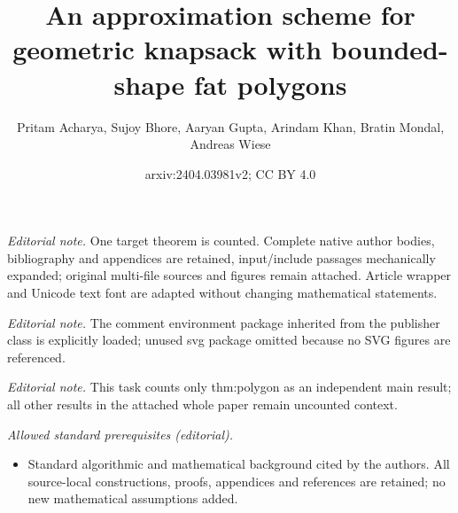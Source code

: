 \documentclass[10pt,a4paper]{article}
\title{An approximation scheme for geometric knapsack with bounded-shape fat polygons}
\author{Pritam Acharya, Sujoy Bhore, Aaryan Gupta, Arindam Khan, Bratin Mondal, Andreas Wiese}
\date{arxiv:2404.03981v2; CC BY 4.0}
\theoremstyle{plain}
\theoremstyle{plain}
\theoremstyle{plain}
\theoremstyle{definition}
\begin{document}
\maketitle
\noindent\textit{Editorial note.} One target theorem is counted. Complete native author bodies, bibliography and appendices are retained, input/include passages mechanically expanded; original multi-file sources and figures remain attached. Article wrapper and Unicode text font are adapted without changing mathematical statements.\par\medskip
\noindent\textit{Editorial note.} The comment environment package inherited from the publisher class is explicitly loaded; unused svg package omitted because no SVG figures are referenced.\par\medskip
\noindent\textit{Editorial note.} This task counts only thm:polygon as an independent main result; all other results in the attached whole paper remain uncounted context.\par\medskip
\noindent\textit{Allowed standard prerequisites (editorial).}\begin{itemize}
\item Standard algorithmic and mathematical background cited by the authors. All source-local constructions, proofs, appendices and references are retained; no new mathematical assumptions added.
\end{itemize}\medskip
\end{document}
